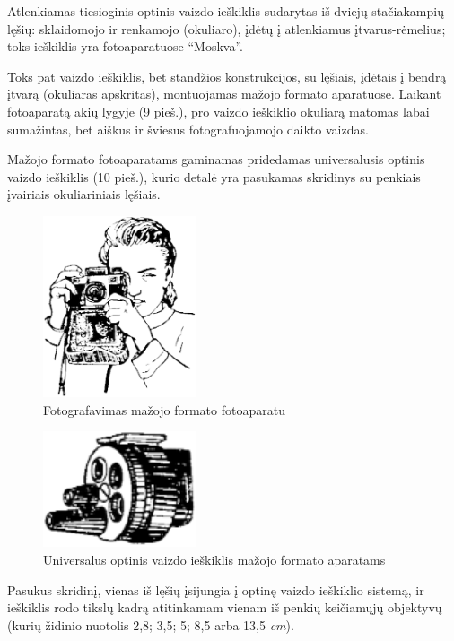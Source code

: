 \documentclass{book}
\begin{document}
					Atlenkiamas tiesioginis optinis vaizdo ieškiklis sudarytas iš dviejų stačiakampių lęšių: sklaidomojo ir renkamojo (okuliaro), įdėtų į atlenkiamus įtvarus-rėmelius; toks ieškiklis yra fotoaparatuose ``Moskva''.

					Toks pat vaizdo ieškiklis, bet standžios konstrukcijos, su lęšiais, įdėtais į bendrą įtvarą (okuliaras apskritas), montuojamas mažojo formato aparatuose. Laikant fotoaparatą akių lygyje (9 pieš.), pro vaizdo ieškiklio okuliarą matomas labai sumažintas, bet aiškus ir šviesus fotografuojamojo daikto vaizdas.

					Mažojo formato fotoaparatams gaminamas pridedamas universalusis optinis vaizdo ieškiklis (10 pieš.), kurio detalė yra pasukamas skridinys su penkiais įvairiais okuliariniais lęšiais.
					\begin{figure}[h]
						\centering
						\includegraphics[width=0.4\textwidth]{9-pav}
						\caption{Fotografavimas mažojo formato fotoaparatu}
						\label{fig:9}
					\end{figure}
					\begin{figure}[h]
						\centering
						\includegraphics[width=0.4\textwidth]{10-pav}
						\caption{Universalus optinis vaizdo ieškiklis mažojo formato aparatams}
						\label{fig:10}
					\end{figure}
					Pasukus skridinį, vienas iš lęšių įsijungia į optinę vaizdo ieškiklio sistemą, ir ieškiklis rodo tikslų kadrą atitinkamam vienam iš penkių keičiamųjų objektyvų (kurių židinio nuotolis 2,8; 3,5; 5; 8,5 arba 13,5 \textit{cm}).
\end{document}
